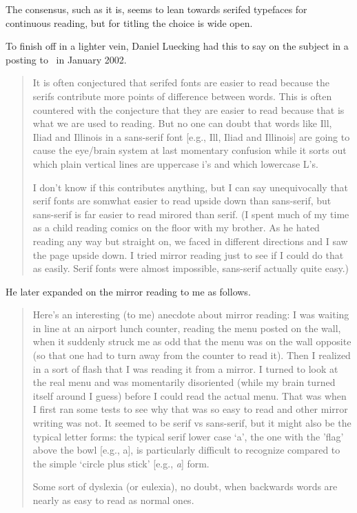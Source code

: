 \documentclass[10pt,a4paper,extrafontsizes]{memoir}
\begin{document}
\begin{paracol}{2}
\begin{itemize}
\end{itemize}

    The consensus, such as it is, seems to lean towards serifed
typefaces for continuous reading, but for titling the choice is
wide open.


    To finish off in a lighter vein,  
    Daniel Luecking had this to say on the subject
in a posting to \pixctt\ in January 2002.
\begin{quotation}
    It is often conjectured that serifed fonts are easier to read because
the serifs contribute more points of difference between words. This is
often countered with the conjecture that they are easier to read because 
that is what we are used to reading. But no one can doubt that words
like Ill, Iliad and Illinois in a sans-serif font 
[e.g., \textsf{Ill, Iliad and Illinois}] are going to cause the eye/brain 
system at last momentary confusion while it sorts out which plain vertical
lines are uppercase i's and which lowercase L's.

    I don't know if this contributes anything, but I can say unequivocally
that serif fonts are somwhat easier to read upside down than sans-serif,
but sans-serif is far easier to read mirored than serif. (I spent much
of my time as a child reading comics on the floor with my brother. As
he hated reading any way but straight on, we faced in different directions
and I saw the page upside down. I tried mirror reading just to see if
I could do that as easily. Serif fonts were almost impossible, sans-serif
actually quite easy.)

\end{quotation}

    He later expanded on the mirror reading to me as follows.
\begin{quotation}
Here's an interesting (to me) anecdote about mirror reading: I was waiting
in line at an airport lunch counter, reading the menu posted on the wall,
when it suddenly struck me as odd that the menu was on the wall opposite
(so that one had to turn away from the counter to read it). Then I
realized in a sort of flash that I was reading it from a mirror. I turned
to look at the real menu and was momentarily disoriented (while my brain
turned itself around I guess) before I could read the actual menu. That
was when I first ran some tests to see why that was so easy to read and
other mirror writing was not. It seemed to be serif vs sans-serif, but
it might also be the typical letter forms: the typical serif lower case
`a', the one with the 'flag' above the bowl [e.g., a], is particularly 
difficult to recognize compared to the simple `circle plus stick' 
[e.g., \textit{a}] form.

    Some sort of dyslexia (or eulexia), no doubt, when backwards
words are nearly as easy to read as normal ones.
\end{quotation}
\end{paracol}
\end{document}

